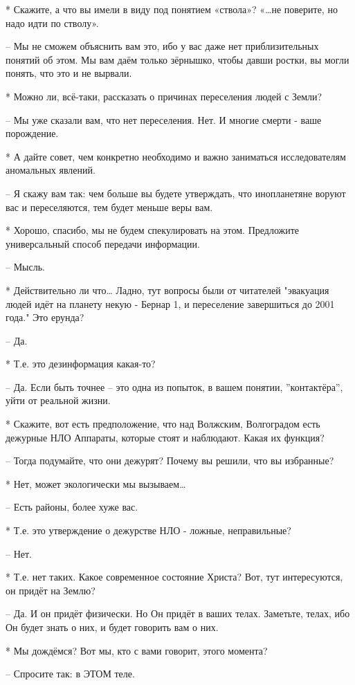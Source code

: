  * Скажите, а что вы имели в виду под понятием «ствола»? «…не поверите, но надо идти по стволу».

 – Мы не сможем объяснить вам это, ибо у вас даже нет приблизительных понятий об этом. Мы вам даём только зёрнышко, чтобы давши ростки, вы могли понять, что это и не вырвали.

 * Можно ли, всё-таки, рассказать о причинах переселения людей с Земли?

 – Мы уже сказали вам, что нет переселения. Нет. И многие смерти - ваше порождение.

 * А дайте совет, чем конкретно необходимо и важно заниматься исследователям аномальных явлений.

 – Я скажу вам так: чем больше вы будете утверждать, что инопланетяне воруют вас и переселяются, тем будет меньше веры вам.

 * Хорошо, спасибо, мы не будем спекулировать на этом. Предложите универсальный способ передачи информации.

 – Мысль.

 * Действительно ли что… Ладно, тут вопросы были от читателей "эвакуация людей идёт на планету некую - Бернар 1, и переселение завершиться до 2001 года." Это ерунда?

 – Да.

 * Т.е. это дезинформация какая-то?

 – Да. Если быть точнее – это одна из попыток, в вашем понятии, ”контактёра”, уйти от реальной жизни.

 * Скажите, вот есть предположение, что над Волжским, Волгоградом есть дежурные НЛО Аппараты, которые стоят и наблюдают. Какая их функция?

 – Тогда подумайте, что они дежурят? Почему вы решили, что вы избранные?

 * Нет, может экологически мы вызываем…

 – Есть районы, более хуже вас.

 * Т.е. это утверждение о дежурстве НЛО - ложные, неправильные?

 – Нет.

 * Т.е. нет таких. Какое современное состояние Христа? Вот, тут интересуются, он придёт на Землю?

 – Да. И он придёт физически. Но Он придёт в ваших телах. Заметьте, телах, ибо Он будет знать о них, и будет говорить вам о них.

 * Мы дождёмся? Вот мы, кто с вами говорит, этого момента?

 – Спросите так: в ЭТОМ теле.

